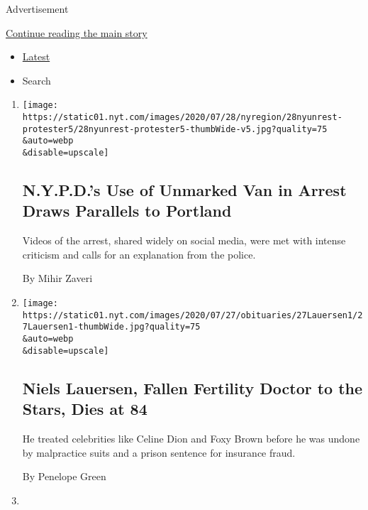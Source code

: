 Advertisement

\protect\hyperlink{after-mid1}{Continue reading the main story}

\begin{itemize}
\tightlist
\item
  \protect\hyperlink{stream-panel}{Latest}
\item
  Search
\end{itemize}

\begin{enumerate}
\def\labelenumi{\arabic{enumi}.}
\item
  \href{/2020/07/28/nyregion/nypd-protester-van.html}{}

  \texttt{[image: https://static01.nyt.com/images/2020/07/28/nyregion/28nyunrest-protester5/28nyunrest-protester5-thumbWide-v5.jpg?quality=75\\\&auto=webp\\\&disable=upscale]}

  \hypertarget{nypds-use-of-unmarked-van-in-arrest-draws-parallels-to-portland}{%
  \subsection{N.Y.P.D.'s Use of Unmarked Van in Arrest Draws Parallels
  to
  Portland}\label{nypds-use-of-unmarked-van-in-arrest-draws-parallels-to-portland}}

  Videos of the arrest, shared widely on social media, were met with
  intense criticism and calls for an explanation from the police.

  By Mihir Zaveri
\item
  \href{/2020/07/28/nyregion/niels-h-lauersen-dead.html}{}

  \texttt{[image: https://static01.nyt.com/images/2020/07/27/obituaries/27Lauersen1/27Lauersen1-thumbWide.jpg?quality=75\\\&auto=webp\\\&disable=upscale]}

  \hypertarget{niels-lauersen-fallen-fertility-doctor-to-the-stars-dies-at-84}{%
  \subsection{Niels Lauersen, Fallen Fertility Doctor to the Stars, Dies
  at
  84}\label{niels-lauersen-fallen-fertility-doctor-to-the-stars-dies-at-84}}

  He treated celebrities like Celine Dion and Foxy Brown before he was
  undone by malpractice suits and a prison sentence for insurance fraud.

  By Penelope Green
\item
  \href{/2020/07/28/arts/design/met-museum-wangechi-mutu.html}{}


\end{enumerate}
